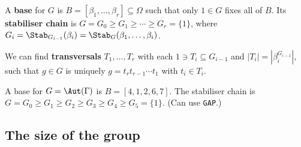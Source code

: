 \documentclass[handout]{beamer}
\begin{document}
\begin{slide}
    A \textbf{base} for $G$ is $B = [\beta_1,\dotsc,\beta_r] \subseteq \Omega$ such that only $1 \in G$ fixes all of $B$. Its \textbf{stabiliser chain} is $G = G_0 \geq G_1 \geq \dotsb \geq G_r = \{1\}$, where $G_i = \Stab_{G_{i - 1}}(\beta_i) = \Stab_G(\beta_1,\dotsc,\beta_i)$. \pause

    We can find \textbf{transversals} $T_1,\dotsc,T_r$ with each $1 \ni T_i \subseteq G_{i - 1}$ and $|T_i| = |\beta_i^{G_{i - 1}}|$, such that $g \in G$ is uniquely $g = t_r t_{r - 1} \dotsb t_1$ with $t_i \in T_i$. \pause

    \begin{center}
    \end{center}

    A base for $G = \Aut(\Gamma)$ is $B = [4,1,2,6,7]$. The stabiliser chain is $G = G_0 \geq G_1 \geq G_2 \geq G_3 \geq G_4 \geq G_5 = \{1\}$. (Can use \texttt{GAP}.)
\end{slide}

\subsection{The size of the group}
\end{document}
